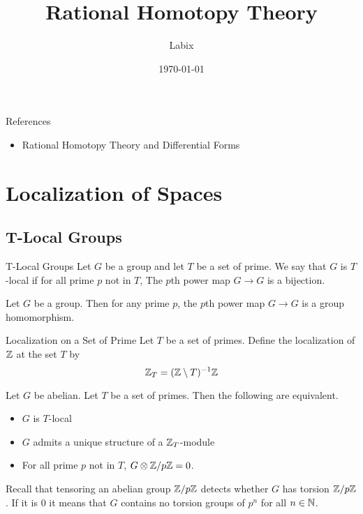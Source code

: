 \documentclass[a4paper]{article}
\title{Rational Homotopy Theory}
\author{Labix}
\date{\today}
\begin{document}
\maketitle
\begin{abstract}
\end{abstract}
References
\begin{itemize}
\item Rational Homotopy Theory and Differential Forms
\end{itemize}
\pagebreak
\tableofcontents

\pagebreak
\section{Localization of Spaces}
\subsection{T-Local Groups}
\begin{defn}{T-Local Groups}{} Let $G$ be a group and let $T$ be a set of prime. We say that $G$ is $T$-local if for all prime $p$ not in $T$, The $p$th power map $G\to G$ is a bijection. 
\end{defn}

\begin{lmm}{}{} Let $G$ be a group. Then for any prime $p$, the $p$th power map $G\to G$ is a group homomorphism. 
\end{lmm}

\begin{defn}{Localization on a Set of Prime}{} Let $T$ be a set of primes. Define the localization of $\mathbb{Z}$ at the set $T$ by $$\mathbb{Z}_T=(\mathbb{Z}\setminus T)^{-1}\mathbb{Z}$$
\end{defn}

\begin{prp}{}{} Let $G$ be abelian. Let $T$ be a set of primes. Then the following are equivalent. 
\begin{itemize}
\item $G$ is $T$-local
\item $G$ admits a unique structure of a $\mathbb{Z}_T$-module
\item For all prime $p$ not in $T$, $G\otimes\mathbb{Z}/p\mathbb{Z}=0$. 
\end{itemize}
\end{prp}

Recall that tensoring an abelian group $\mathbb{Z}/p\mathbb{Z}$ detects whether $G$ has torsion $\mathbb{Z}/p\mathbb{Z}$. If it is $0$ it means that $G$ contains no torsion groups of $p^n$ for all $n\in\mathbb{N}$. 
\end{document}

